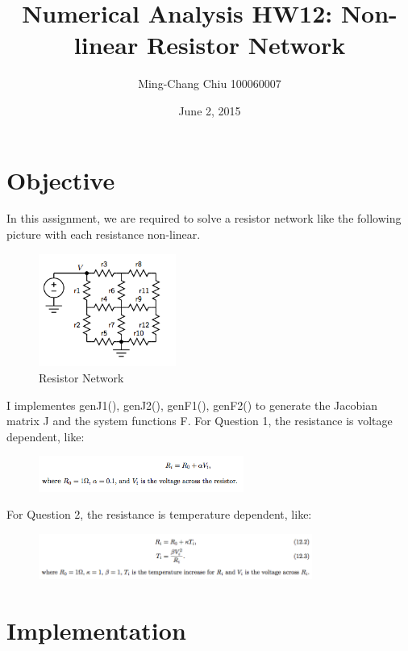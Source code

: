 \documentclass[12pt,a4paper]{article}
\title{Numerical Analysis HW12: Non-linear Resistor Network}
\author{Ming-Chang Chiu 100060007}
\date{June 2, 2015}
\begin{document}
\maketitle
\fontsize{12}{20pt}\selectfont %

\section{Objective}
In this assignment, we are required to solve a resistor network like the following picture with each resistance non-linear. 
\begin{figure}[h!]
  \centering
     \includegraphics[width=0.4\textwidth]{./network.png}
  \caption{Resistor Network}
\end{figure}


I implementes genJ1(), genJ2(), genF1(), genF2() to generate the Jacobian matrix J and the system functions F. 
For Question 1, the resistance is voltage dependent, like:
\begin{figure}[h!]
  \centering
     \includegraphics[width=0.6\textwidth]{./vq1.png}
\end{figure}

For Question 2, the resistance is temperature dependent, like:
\begin{figure}[h!]
  \centering
     \includegraphics[width=0.8\textwidth]{./vq2.png}
\end{figure}
\section{Implementation}
\end{document}
